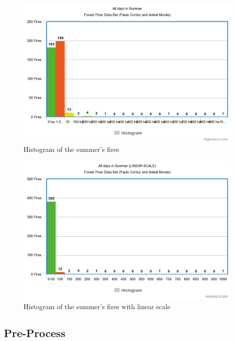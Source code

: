 \documentclass[runningheads]{llncs}
\begin{document}
\begin{figure}
    \caption{Histogram of the summer's fires}\label{hist3}
    \centerline{\includegraphics[width=1\columnwidth]{imagens/AllSummer.png}}
    \label{Summ}
\end{figure}
\begin{figure}
    \caption{Histogram of the summer's fires with linear scale}\label{hist4}
    \centerline{\includegraphics[width=1\columnwidth]{imagens/AllSummerLinear.png}}
    \label{SummL}
\end{figure}
\break
\subsection{Pre-Process}
\paragraph{}
\end{document}
